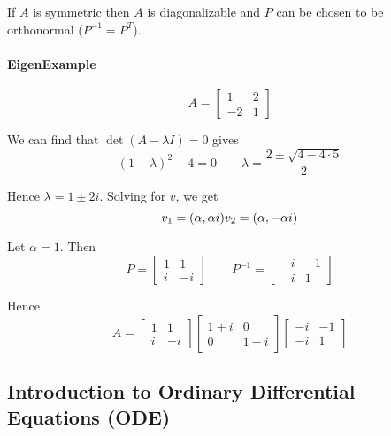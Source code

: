 \documentclass{article}
\begin{document}
\begin{theorem}
  If $A$ is symmetric then $A$ is diagonalizable and $P$ can be chosen to be orthonormal ($P^{-1} = P^T$).
\end{theorem}

\paragraph{EigenExample}
\label{par:eigenexample}

\[
  A = \left[\begin{matrix}
      1 & 2 \\ -2 & 1
  \end{matrix}\right]
\]

We can find that $\det(A - \lambda I) = 0$ gives
\[
  (1 - \lambda)^2 + 4 = 0
  \quad\quad
  \lambda = \dfrac{2 \pm \sqrt{4 - 4 \cdot 5}}{2}
\]

Hence $\lambda = 1 \pm 2i$. Solving for $v$, we get
\[
  v_1 = (\alpha, \alpha i)
  \\
  v_2 = (\alpha, -\alpha i)
\]

Let $\alpha = 1$. Then
\[
  P = \left[\begin{matrix}
    1 & 1 \\ i & -i
  \end{matrix}\right]
  \quad\quad
  P^{-1} = \left[\begin{matrix}
    -i & -1 \\ -i & 1
  \end{matrix}\right]
\]

Hence
\[
  A =
  \left[\begin{matrix}
    1 & 1 \\ i & -i
  \end{matrix}\right]
  \left[\begin{matrix}
    1 + i & 0 \\ 0 & 1 - i
  \end{matrix}\right]
  \left[\begin{matrix}
    -i & -1 \\ -i & 1
  \end{matrix}\right]
\]

\subsection{Introduction to Ordinary Differential Equations (ODE)}
\label{sub:introduction_to_ordinary_differential_equations_ode_}
\end{document}
